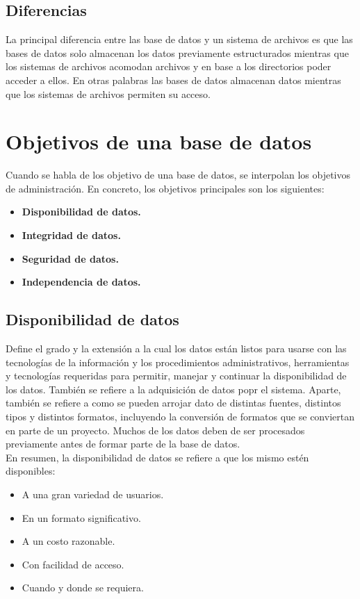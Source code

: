 \documentclass[letterpaper, 12pt]{article}
\begin{document}
\begin{justify}
            \subsection{Diferencias}
            \justify
        La principal diferencia entre las base de datos y un sistema de archivos es que las bases de datos solo almacenan los datos previamente estructurados mientras que los sistemas de archivos
        acomodan archivos y en base a los directorios poder acceder a ellos. En otras palabras las bases de datos almacenan datos mientras que los sistemas de archivos permiten su acceso.
        \section{Objetivos de una base de datos}
        \justify
        Cuando se habla de los objetivo de una base de datos, se interpolan los objetivos de administración. En concreto, los objetivos principales son los siguientes:
        \begin{itemize}
            \item \textbf{Disponibilidad de datos.}
            \item \textbf{Integridad de datos.}
            \item \textbf{Seguridad de datos.}
            \item \textbf{Independencia de datos.}
        \end{itemize}
        \subsection{Disponibilidad de datos}
        \justify
        Define el grado y la extensión a la cual los datos están listos para usarse con las tecnologías de la información y los procedimientos administrativos, herramientas y tecnologías requeridas para permitir,
        manejar y continuar la disponibilidad de los datos. También se refiere a la adquisición de datos popr el sistema. Aparte, también se refiere a como se pueden arrojar dato de distintas fuentes, distintos tipos y distintos formatos, incluyendo
        la conversión de formatos que se conviertan en parte de un proyecto. Muchos de los datos deben de ser procesados previamente antes de formar parte de la base de datos.
        \\\newline
        En resumen, la disponibilidad de datos se refiere a que los mismo estén disponibles:
        \begin{itemize}
            \item A una gran variedad de usuarios.
            \item En un formato significativo.
            \item A un costo razonable.
            \item Con facilidad de acceso.
            \item Cuando y donde se requiera.
        \end{itemize}

\end{justify}
\end{document}
